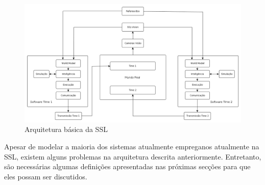 \begin{landscape}
  \begin{figure}[thpb]
    \centering
    \includegraphics[width=20cm]{imgs/arquitetura_ssl}
    \caption{Arquitetura básica da SSL}
    \label{arquitetura_ssl}
  \end{figure}
\end{landscape}

Apesar de modelar a maioria dos sistemas atualmente empreganos atualmente na
SSL, existem alguns problemas na arquitetura descrita anteriormente. Entretanto,
são necessárias algumas definições apresentadas nas próximas secções para que eles possam ser discutidos.